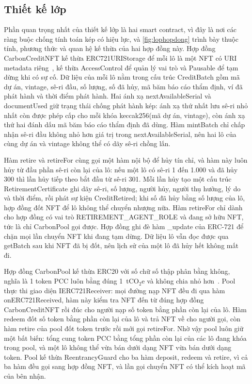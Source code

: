 \subsection*{Thiết kế lớp}
\label{subsec:tk-lop}
\label{sec:tk-hopdong}

Phần quan trọng nhất của thiết kế lớp là hai smart contract, vì đây là nơi các ràng buộc chống tính toán kép có hiệu lực, và \autoref{fig:lophopdong} trình bày thuộc tính, phương thức và quan hệ kế thừa của hai hợp đồng này. Hợp đồng CarbonCreditNFT kế thừa ERC721URIStorage để mỗi lô là một NFT có URI metadata riêng~\cite{eip721}, kế thừa AccessControl để quản lý vai trò và Pausable để tạm dừng khi có sự cố. Dữ liệu của mỗi lô nằm trong cấu trúc CreditBatch gồm mã dự án, vintage, sê-ri đầu, số lượng, số đã hủy, mã băm báo cáo thẩm định, ví đã phát hành và thời điểm phát hành. Hai ánh xạ nextAvailableSerial và documentUsed giữ trạng thái chống phát hành kép: ánh xạ thứ nhất lưu sê-ri nhỏ nhất còn được phép cấp cho mỗi khóa keccak256(mã dự án, vintage), còn ánh xạ thứ hai đánh dấu mã băm báo cáo thẩm định đã dùng. Hàm mintBatch chỉ chấp nhận sê-ri đầu không nhỏ hơn giá trị trong nextAvailableSerial, nên hai lô của cùng dự án và vintage không thể có dãy sê-ri chồng lấn.

Hàm retire và retireFor cùng gọi một hàm nội bộ để hủy tín chỉ, và hàm này luôn hủy từ đầu phần sê-ri còn lại của lô: nếu một lô có sê-ri 1 đến 1.000 và đã hủy 300 thì lần hủy tiếp theo bắt đầu từ sê-ri 301. Mỗi lần hủy tạo một cấu trúc RetirementCertificate ghi dãy sê-ri, số lượng, người hủy, người thụ hưởng, lý do và thời điểm, rồi phát sự kiện CreditRetired; khi số đã hủy bằng số lượng của lô, hợp đồng đốt NFT để lô không thể chuyển nhượng nữa. Hàm retireFor chỉ dành cho hợp đồng có vai trò RETIREMENT\_AGENT\_ROLE và đang sở hữu NFT, tức là chỉ CarbonPool gọi được. Hợp đồng ghi đè hàm \_update của ERC-721 để chặn mọi lần chuyển NFT khi đang tạm dừng. Dữ liệu lô vẫn đọc được qua getBatch sau khi NFT đã bị đốt, nên lịch sử của một lô đã hủy hết không mất đi.

Hợp đồng CarbonPool kế thừa ERC20 với số chữ số thập phân bằng không, nghĩa là 1 token PCC luôn bằng đúng 1~tCO$_2$e và không chia nhỏ hơn~\cite{eip20}. Pool thực thi giao diện IERC721Receiver: mọi đường nạp NFT đều đi qua hàm onERC721Received, hàm này kiểm tra NFT đến từ đúng hợp đồng CarbonCreditNFT rồi đúc cho người nạp số token bằng phần còn lại của lô. Hàm redeem đốt số token bằng phần còn lại của lô và trả NFT về cho người gọi, còn hàm retire của pool đốt token trước rồi mới gọi retireFor. Nhờ vậy pool luôn giữ một bất biến: tổng cung token PCC bằng tổng phần còn lại của các lô đang khóa trong pool, và một lô không thể vừa bán dưới dạng NFT vừa bán dưới dạng token. Pool kế thừa ReentrancyGuard cho ba hàm deposit, redeem và retire, vì cả ba hàm đều gọi sang hợp đồng NFT, và lần gọi chuyển NFT có thể kích hoạt mã của bên nhận.

